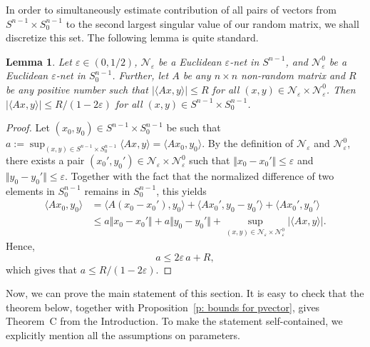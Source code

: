 \documentclass[12pt]{article}
\newtheorem{lemma}[theorem]{Lemma}
\theoremstyle{definition}
\theoremstyle{plain}
\def\epsnet{\mathcal{N}_{\varepsilon}}
\begin{document}
In order to simultaneously estimate contribution of all pairs of vectors from $S^{n-1}\times S_0^{n-1}$
to the second largest singular value of our random matrix, we shall discretize this set. 
The following lemma is quite standard.

\begin{lemma}\label{lem-net-approx}
Let $\varepsilon\in (0,1/2)$, $\epsnet$ be a Euclidean $\varepsilon$-net in $S^{n-1}$,
and $\epsnet^0$ be a Euclidean $\varepsilon$-net in $S_0^{n-1}$. Further, let $A$ be any $n\times n$ non-random matrix
and $R$ be any positive number such that 
$\vert\langle Ax,y\rangle\vert\leq R$ for all $(x,y)\in \epsnet\times \epsnet^0$.
Then $\vert\langle Ax,y\rangle\vert \leq R/(1-2\varepsilon)$ for all $(x,y)\in S^{n-1}\times S_0^{n-1}$. 
\end{lemma}
\begin{proof}
Let $(x_0, y_0)\in S^{n-1}\times S_0^{n-1}$ be such that $a:= \sup_{(x,y)\in S^{n-1}\times S_0^{n-1}} \langle Ax,y\rangle = \langle Ax_0,y_0\rangle$. 
By the definition of $\epsnet$ and $\epsnet^0$, there exists a pair $(x_0',y_0')\in \epsnet\times \epsnet^0$ such that
$\Vert x_0-x_0'\Vert\leq \varepsilon$ and $\Vert y_0-y_0'\Vert\leq \varepsilon$. 
Together with the fact that the normalized difference of two elements in $S_0^{n-1}$ remains in $S_0^{n-1}$, this yields
\begin{align*}
\langle Ax_0,y_0\rangle&= \langle A(x_0-x_0'),y_0\rangle+\langle Ax_0',y_0-y_0'\rangle+\langle Ax_0',y_0'\rangle \\
&\leq a\Vert x_0-x_0'\Vert+ a\Vert y_0-y_0'\Vert+ \sup_{(x,y)\in \epsnet\times \epsnet^0} \vert\langle Ax,y\rangle\vert.
\end{align*}
Hence,
$$
a\leq 2\varepsilon\, a+ R,
$$
which gives that $a\leq R/(1-2\varepsilon)$.

\end{proof}

Now, we can prove the main statement of this section. It is easy to check that the theorem below, together with
Proposition~\ref{p: bounds for pvector}, 
gives Theorem~C from the Introduction.
To make the statement self-contained, we explicitly mention all the assumptions on parameters.
\end{document}
